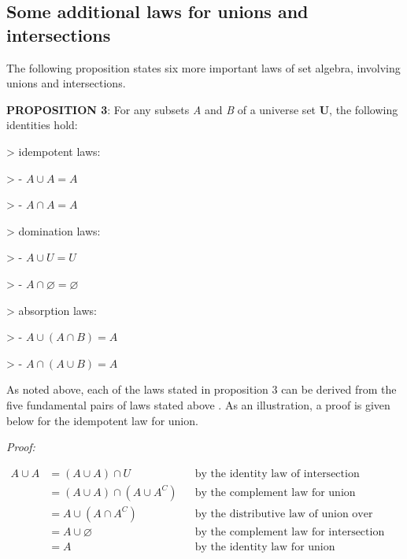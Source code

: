 \subsection{Some additional laws for unions and intersections}
\label{sss:some-d00a}




The following proposition states six more important laws of set algebra, involving unions
and intersections.



\textbf{PROPOSITION 3}: For any subsets \textit{A} and \textit{B} of a universe set \textbf{U}, the following identities hold:



> idempotent laws:

>    - $A \cup A = A$

>    - $A \cap A = A$



> domination laws:

>    - $A \cup U = U$

>    - $A \cap \varnothing = \varnothing$



> absorption laws:

>    - $A \cup (A \cap B) = A$

>    - $A \cap (A \cup B) = A$



As noted above, each of the laws stated in proposition 3 can be derived from the five
fundamental pairs of laws stated above . As an illustration, a proof is given below for
the idempotent law for union.



\textit{Proof:}



\begin{align} A \cup A & = (A \cup A) \cap U && \text{by the identity law of intersection} \\ & = (A \cup A) \cap (A \cup A^C) && \text{by the complement law for union} \\ & = A \cup (A \cap A^C) && \text{by the distributive law of union over intersection} \\ & = A \cup \varnothing && \text{by the complement law for intersection} \\ & = A && \text{by the identity law for union} \end{align}



